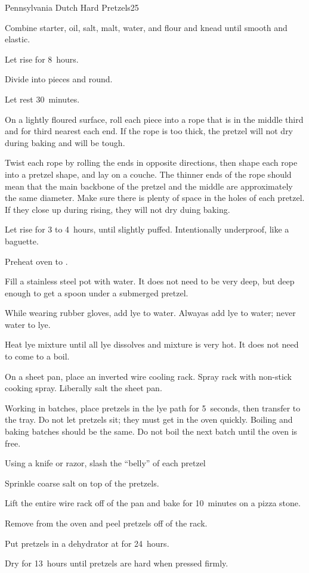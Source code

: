 \begin{recipe}{Pennsylvania Dutch Hard Pretzels}{}{25}
\begin{directions}
\item Combine starter, oil, salt, malt, water, and flour and knead until smooth and elastic.
\item Let rise for 8~hours.
\item Divide into  pieces and round.
\item Let rest 30~minutes.
\item On a lightly floured surface, roll each piece into a rope that is \inch{\half} in the middle third and \inch{\quarter} for third nearest each end. If the rope is too thick, the pretzel will not dry during baking and will be tough.
\item Twist each rope by rolling the ends in opposite directions, then shape each rope into a pretzel shape, and lay on a couche. The thinner ends of the rope should mean that the main backbone of the pretzel and the middle are approximately the same diameter. Make sure there is plenty of space in the holes of each pretzel. If they close up during rising, they will not dry duing baking.
\item Let rise for 3 to 4~hours, until slightly puffed. Intentionally underproof, like a baguette.
\item Preheat oven to .
\item Fill a stainless steel pot with water. It does not need to be very deep, but deep enough to get a spoon under a submerged pretzel.
\item While wearing rubber gloves, add lye to water. Alwayas add lye to water; never water to lye.
\item Heat lye mixture until all lye dissolves and mixture is very hot. It does not need to come to a boil.
\item On a sheet pan, place an inverted wire cooling rack. Spray rack with non-stick cooking spray. Liberally salt the sheet pan.
\item Working in batches, place pretzels in the lye path for 5~seconds, then transfer to the tray. Do not let pretzels sit; they must get in the oven quickly. Boiling and baking batches should be the same. Do not boil the next batch until the oven is free.
\item Using a knife or razor, slash the ``belly'' of each pretzel
\item Sprinkle coarse salt on top of the pretzels.
\item Lift the entire wire rack off of the pan and bake for 10~minutes on a pizza stone.
\item Remove from the oven and peel pretzels off of the rack.
\item Put pretzels in a dehydrator at  for 24~hours.
\item Dry for 13~hours until pretzels are hard when pressed firmly.
\end{directions}


\end{recipe}
